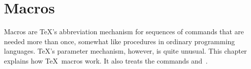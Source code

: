 
\chapter{Macros}\label{macro}

Macros are \TeX's abbreviation mechanism for sequences of commands
that are needed more than once,
somewhat like procedures in ordinary programming languages.
\TeX's parameter mechanism, however, is quite unusual.
This chapter explains how \TeX\ macros work. It also
treats the commands  and~.

